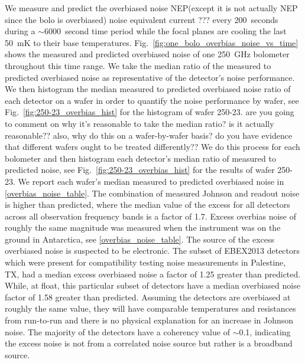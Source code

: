 We measure and predict the overbiased noise
\ac{NEP}(except it is not actually NEP since the bolo is overbiased) 
 noise equivalent current ???
every 200~seconds during a $\sim$6000~second time period while the focal planes are cooling the last 50~mK to their base temperatures.
Fig.~\ref{fig:one_bolo_overbias_noise_vs_time} shows the measured and predicted overbiased noise of one 250~GHz bolometer throughout this time range.  
We take the median ratio of the measured to predicted overbiased noise as representative of the detector's noise performance.
We then histogram the median measured to predicted overbiased noise ratio of each detector on a wafer in order to quantify the noise performance by wafer, see Fig.~\ref{fig:250-23_overbias_hist} for the histogram of wafer 250-23. 
are you going to comment on why it's reasonable to take the median ratio? is it actually reasonable?? also, why do this on a wafer-by-wafer basis? do you have evidence that different wafers ought to be treated differently??
We do this process for each bolometer and then histogram each detector's median ratio of measured to predicted noise, see Fig.~\ref{fig:250-23_overbias_hist} for the results of wafer 250-23. 
We report each wafer's median measured to predicted overbiased noise in \TAB\ref{overbias_noise_table}. 
The combination of measured Johnson and readout noise is higher than predicted, where the median value of the excess for all detectors across all observation frequency bands is a factor of 1.7.  
Excess overbias noise of roughly the same magnitude was measured when the instrument was on the ground in Antarctica, see \TAB\ref{overbias_noise_table}. 
The source of the excess overbiased noise is suspected to be electronic. The subset of \ac{EBEX2013} detectors which were present for compatibility testing noise measurements in Palestine, TX, had a median excess overbiased noise a factor of 1.25 greater than predicted. While, at float, this particular subset of detectors have a median overbiased noise factor of 1.58 greater than predicted. Assuming the detectors are overbiased at roughly the same value, they will have comparable temperatures and resistances from run-to-run and there is no physical explanation for an increase in Johnson noise. 
The majority of the detectors have a coherency value of $\sim$0.1, indicating the excess noise is not from a correlated noise source but rather is a broadband source. 



